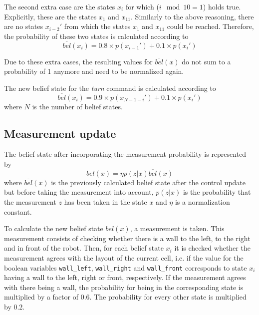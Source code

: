 \documentclass[10pt,a4paper]{article}
\begin{document}
		The second extra case are the states $x_i$ for which ($i \mod{10}=1$) holds true. Explicitly, these are the states $x_1$ and $x_{11}$. Similarly to the above reasoning, there are no states $x_{i-2}'$ from which the states $x_1$ and $x_{11}$ could be reached. Therefore, the probability of these two states is calculated according to		
		\begin{displaymath}
			\overline{bel}(x_i) = 0.8\times p(x_{i-1}') + 0.1\times p(x_i')
		\end{displaymath}
		
		Due to these extra cases, the resulting values for $\overline{bel}(x)$ do not sum to a probability of 1 anymore and need to be normalized again.
		
		The new belief state for the \textit{turn} command is calculated according to		
		\begin{displaymath}
			\overline{bel}(x_i) = 0.9\times p(x_{N-1-i}') + 0.1\times p(x_i')
		\end{displaymath}
		where $N$ is the number of belief states.
		
		\subsection{Measurement update}
		The belief state after incorporating the measurement probability is represented by
		\begin{displaymath}
			bel(x)=\eta p(z|x)\overline{bel}(x)
		\end{displaymath}
		where $\overline{bel}(x)$ is the previously calculated belief state after the control update but before taking the measurement into account, $p(z|x)$ is the probability that the measurement $z$ has been taken in the state $x$ and $\eta$ is a normalization constant.
		
		To calculate the new belief state $bel(x)$, a measurement is taken. This measurement consists of checking whether there is a wall to the left, to the right and in front of the robot. Then, for each belief state $x_i$ it is checked whether the measurement agrees with the layout of the current cell, i.e. if the value for the boolean variables \verb|wall_left|, \verb|wall_right| and \verb|wall_front| corresponds to state $x_i$ having a wall to the left, right or front, respectively. If the measurement agrees with there being a wall, the probability for being in the corresponding state is multiplied by a factor of $0.6$. The probability for every other state is multiplied by $0.2$.
		
\end{document}
